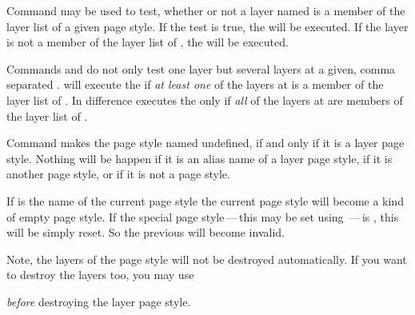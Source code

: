 \begin{Declaration}
\end{Declaration}
Command  may be used to test, whether or not a layer
named  is a member of the layer list of a given page
style. If the test is true, the  will be executed. If the
layer is not a member of the layer list of , the
 will be executed.

Commands  and  do not
only test one layer but several layers at a given, comma separated
.  will execute the
 if \emph{at least one} of the layers at 
is a member of the layer list of . In difference
 executes the  only if \emph{all}
of the layers at  are members of the layer list of
.%
\EndIndexGroup


\begin{Declaration}
\end{Declaration}
Command  makes the page style named
 undefined, if and only if it is a layer page
style. Nothing will be happen if it is an alias name of a layer page style, if
it is another page style, or if it is not a page style. 

If  is the name of the current page style the current
page style will become a kind of empty page style. If the special page
style\,---\,this may be set using \,---\,is
, this will be simply reset. So the previous
 will become invalid.

Note, the layers of the page style will not be destroyed
automatically. If you want to destroy the layers too, you may use
\begin{lstcode}
\end{lstcode}
\emph{before} destroying the layer page style.

